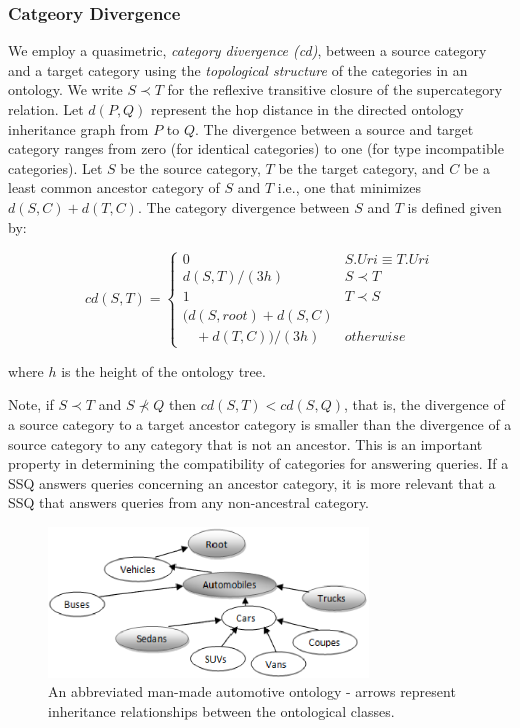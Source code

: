 \subsubsection{Catgeory Divergence}
\label{sec:ctd}

We employ a quasimetric, \textit{category
divergence (cd)},
between a source category and a target category using the \textit{topological
structure} of the categories in an ontology. We write $S \prec T$ for the
reflexive
transitive closure of the supercategory relation. Let $d(P,Q)$ represent the hop
distance in the directed ontology inheritance graph from $P$ to $Q$. The
divergence between a source and target category ranges from zero (for identical
categories) to one (for type incompatible categories). Let $S$ be the source
category, $T$ be
the target category, and $C$ be a least common ancestor category of $S$ and
$T$ i.e., one that minimizes $d(S,C) + d(T,C)$. The category divergence between $S$ and $T$ is defined given by:

\begin{equation}
cd(S, T) = \begin{cases}
0 & S.{Uri} \equiv T.{Uri}\\
d(S, T)/(3h) & S \prec T\\
1 & T \prec S\\
(d(S,root) + d(S,C) \\ \ \ \ \ + d(T,C))/(3h) & otherwise
\end{cases}
\end{equation}

\noindent where $h$ is the height of the ontology tree.

Note, if $S \prec T$ and $S \not\prec Q$ then $cd(S,T) <
cd(S,Q)$, that is, the divergence of a source category to a target
ancestor category is smaller than the divergence of a source category to any
category that is not an ancestor. This is an important property in
determining the compatibility of categories for answering queries.  If a
SSQ answers queries concerning an ancestor category, it is more relevant
that a SSQ that answers queries from any non-ancestral category.

\begin{figure}[t]
\centering
\includegraphics[width=85mm]{img/automotive_ontology.eps}
\caption{An abbreviated man-made automotive ontology - arrows represent inheritance relationships between the ontological classes.}
\label{fig:automotive_ontology}
\end{figure}

